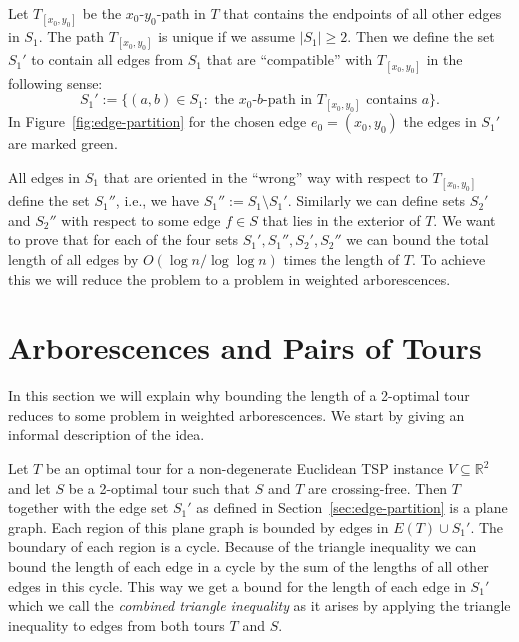 \documentclass[a4paper, 11pt]{article}
\begin{document}
Let $T_{[x_0,y_0]}$ be the $x_0$-$y_0$-path in $T$ that contains the endpoints of all other edges in $S_1$. The path $T_{[x_0,y_0]}$ is unique if 
we assume $|S_1|\ge 2$. 
Then we define the set $S_1'$ to contain all edges from $S_1$ that are ``compatible'' with $T_{[x_0,y_0]}$ in the following sense:
\[ S_1' := \{(a,b) \in S_1 : \mbox{ the } x_0\mbox{-}b\mbox{-}\mbox{path in } T_{[x_0,y_0]} \mbox{ contains } a\} . \]
In Figure~\ref{fig:edge-partition} for the chosen edge $e_0=(x_0,y_0)$ the edges in $S_1'$ are marked green.

All edges in $S_1$ that are oriented in the ``wrong'' way with respect to $T_{[x_0,y_0]}$ define the set $S_1''$, i.e., we have
$S_1'' := S_1 \setminus S_1'$. Similarly we can define sets $S_2'$ and $S_2''$ with respect to some edge $f\in S$ that lies in the
exterior of $T$. We want to prove that for each of the four sets $S_1', S_1'', S_2', S_2''$ we can bound the total length of all edges by 
 $O(\log n / \log \log n)$ times the length of $T$. To achieve this we will reduce the problem to a problem in 
weighted arborescences.  
 
 


\section{Arborescences and Pairs of Tours}
\label{sec:proofidea}

In this section we will explain why bounding the length of a 2-optimal tour
reduces to some problem in weighted arborescences. We start by giving an informal description of the idea. 

Let $T$ be an optimal tour for a non-degenerate Euclidean TSP instance $V\subseteq \mathbb{R}^2$ and let $S$ be a 2-optimal tour such that $S$ and $T$ are crossing-free. 
Then $T$ together with the edge set $S_1'$ as defined in Section~\ref{sec:edge-partition} is a plane graph. 
Each region of this plane graph is bounded by edges in $E(T) \cup S_1'$. The boundary of each region is a cycle. Because of the
triangle inequality we can bound the length of each edge in a cycle by the sum of the lengths of all other edges in this cycle. 
This way we get a bound for the length of each edge in $S_1'$ which we call the \emph{combined triangle inequality} as
it arises by applying the triangle inequality to edges from both tours $T$ and $S$.
\end{document}
